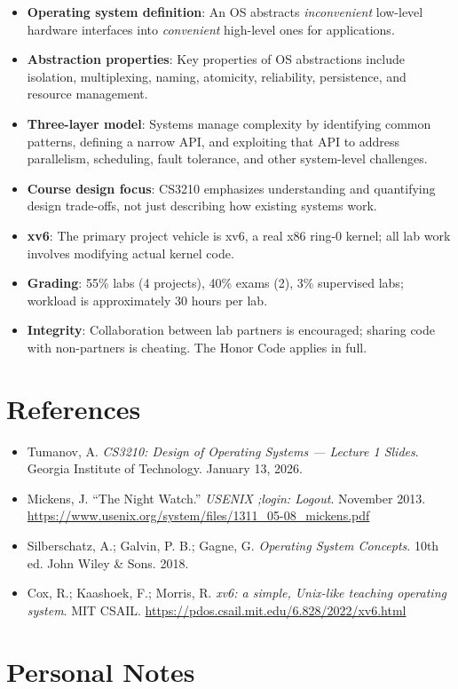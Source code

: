 \documentclass[11pt]{article}
\begin{document}
\begin{itemize}
    \item \textbf{Operating system definition}: An OS abstracts \emph{inconvenient} low-level
          hardware interfaces into \emph{convenient} high-level ones for applications.
    \item \textbf{Abstraction properties}: Key properties of OS abstractions include isolation,
          multiplexing, naming, atomicity, reliability, persistence, and resource management.
    \item \textbf{Three-layer model}: Systems manage complexity by identifying common patterns,
          defining a narrow API, and exploiting that API to address parallelism, scheduling,
          fault tolerance, and other system-level challenges.
    \item \textbf{Course design focus}: CS3210 emphasizes understanding and quantifying
          design trade-offs, not just describing how existing systems work.
    \item \textbf{xv6}: The primary project vehicle is xv6, a real x86 ring-0 kernel; all
          lab work involves modifying actual kernel code.
    \item \textbf{Grading}: 55\% labs (4 projects), 40\% exams (2), 3\% supervised labs;
          workload is approximately 30 hours per lab.
    \item \textbf{Integrity}: Collaboration between lab partners is encouraged; sharing code
          with non-partners is cheating. The Honor Code applies in full.
\end{itemize}

\section{References}

\begin{itemize}
    \item Tumanov, A. \textit{CS3210: Design of Operating Systems --- Lecture 1 Slides}.
          Georgia Institute of Technology. January 13, 2026.
    \item Mickens, J. ``The Night Watch.'' \textit{USENIX ;login: Logout}. November 2013.
          \url{https://www.usenix.org/system/files/1311_05-08_mickens.pdf}
    \item Silberschatz, A.; Galvin, P. B.; Gagne, G. \textit{Operating System Concepts}.
          10th ed. John Wiley \& Sons. 2018.
    \item Cox, R.; Kaashoek, F.; Morris, R. \textit{xv6: a simple, Unix-like teaching operating
          system}. MIT CSAIL. \url{https://pdos.csail.mit.edu/6.828/2022/xv6.html}
\end{itemize}

\section*{Personal Notes}
\end{document}
